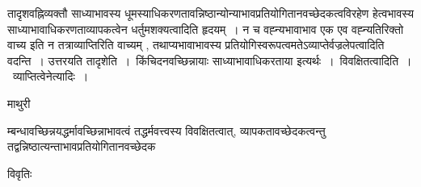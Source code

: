 \documentclass[10pt, openany]{book}
\begin{document}
{तादृशवह्निव्यक्तौ साध्याभावस्य धूमस्याधिकरणतावन्निष्ठान्योन्याभावप्रतियोगितानवच्छेदकत्वविरहेण हेत्वभावस्य साध्याभावाधिकरणताव्यापकत्वेन धर्तुमशक्यत्वादिति
हृदयम्~। न च वह्न्यभावाभाव एक एव वह्न्यतिरिक्तो वाच्य इति न तत्राव्याप्तिरिति वाच्यम् , तथाप्यभावाभावस्य प्रतियोगिस्वरूपत्वमतेऽव्याप्तेर्वज्रलेपत्वादिति वदन्ति~। उत्तरयति {\la तादृशेति~।}~किंचिदनवच्छिन्नायाः साध्याभावाधिकरताया इत्यर्थः~।~{\qt विवक्षितत्वादिति~।}~व्याप्तित्वेनेत्यादिः~।
\newpage
 \begin{center}  माथुरी  \end{center} 
{\la म्बन्धावच्छिन्नयद्धर्मावच्छिन्नाभावत्वं तद्धर्मवत्त्वस्य विवक्षितत्वात्,  व्यापकतावच्छेदकत्वन्तु तद्वन्निष्ठात्यन्ताभावप्रतियोगितानवच्छेदक}
\begin{center}     विवृतिः \end{center}

}
\end{document}
